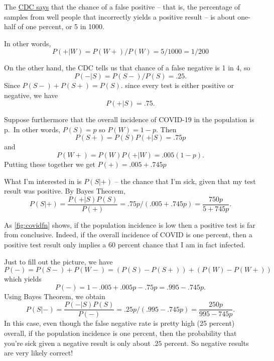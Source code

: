 \documentclass[
]{article}
\begin{document}
The
\href{https://www.icd10monitor.com/false-positives-in-pcr-tests-for-covid-19}{CDC
says} that the chance of a false positive -- that is, the percentage of
samples from well people that incorrectly yields a positive result -- is
about one-half of one percent, or 5 in 1000.

In other words, \[
P(+|W) = P(W+)/P(W) = 5/1000=1/200
\]

On the other hand, the CDC tells us that chance of a false negative is 1
in 4, so \[
P(-|S) = P(S-)/P(S) = .25.
\] Since \(P(S-)+P(S+)=P(S).\) since every test is either positive or
negative, we have \[
P(+|S) = .75.
\]

Suppose furthermore that the overall incidence of COVID-19 in the
population is p.~In other words, \(P(S)=p\) so \(P(W)=1-p\). Then
\[P(S+)=P(S)P(+|S)=.75p\] and \[
P(W+)=P(W)P(+|W)=.005(1-p).
\] Putting these together we get \(P(+)=.005+.745p\)

What I'm interested in is \(P(S|+)\) -- the chance that I'm sick, given
that my test result was positive. By Bayes Theorem, \[
P(S|+)=\frac{P(+|S)P(S)}{P(+)}=.75p/(.005+.745p)=\frac{750p}{5+745p}.
\]

As \cref{fig:covidfn} shows, if the population incidence is low then a
positive test is far from conclusive. Indeed, if the overall incidence
of COVID is one percent, then a positive test result only implies a 60
percent chance that I am in fact infected.

Just to fill out the picture, we have \[
P(-) = P(S-)+P(W-)=(P(S)-P(S+))+(P(W)-P(W+))
\] which yields \[
P(-)=1-.005+.005p-.75p = .995-.745p.
\] Using Bayes Theorem, we obtain \[
P(S|-) = \frac{P(-|S)P(S)}{P(-)} = .25p/(.995-.745p) =\frac{250p}{995-745p}.
\] In this case, even though the false negative rate is pretty high (25
percent) overall, if the population incidence is one percent, then the
probability that you're sick given a negative result is only about
\(.25\) percent. So negative results are very likely correct!
\end{document}
